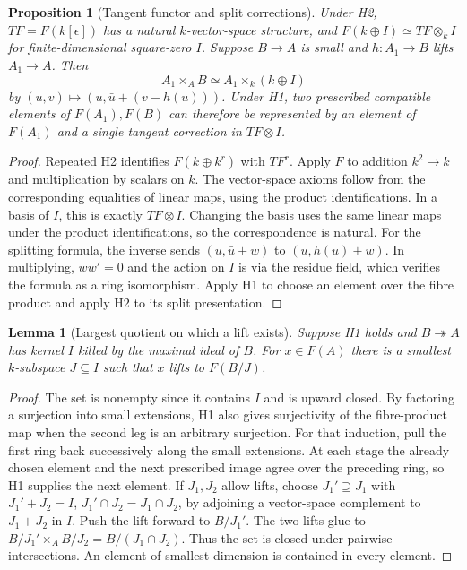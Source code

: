 \documentclass[11pt,oneside,openany]{book}
\newtheorem{lemma}[theorem]{Lemma}
\newtheorem{proposition}[theorem]{Proposition}
\theoremstyle{definition}
\theoremstyle{remark}
\begin{document}
\begin{proposition}[Tangent functor and split corrections]\label{res:T07}
Under H2, \(TF=F(k[\epsilon])\) has a natural \(k\)-vector-space structure,
and \(F(k\oplus I)\simeq TF\otimes_k I\) for finite-dimensional
square-zero \(I\). Suppose \(B\to A\) is small and
\(h:A_1\to B\) lifts \(A_1\to A\). Then
\[
 A_1\times_A B \simeq A_1\times_k (k\oplus I)
\]
by \((u,v)\mapsto (u,\bar u+(v-h(u)))\).
Under H1, two prescribed compatible elements of \(F(A_1),F(B)\)
can therefore be represented by an element of \(F(A_1)\) and a
single tangent correction in \(TF\otimes I\).
\end{proposition}
\begin{proof}
Repeated H2 identifies \(F(k\oplus k^r)\) with \(TF^r\).
Apply \(F\) to addition \(k^2\to k\) and multiplication by scalars
on \(k\). The vector-space axioms follow from the corresponding
equalities of linear maps, using the product identifications.
In a basis of \(I\), this is exactly \(TF\otimes I\).
Changing the basis uses the same linear maps under the product
identifications, so the correspondence is natural.
For the splitting formula, the inverse sends
\((u,\bar u+w)\) to \((u,h(u)+w)\). In multiplying, \(w w'=0\)
and the action on \(I\) is via the residue field, which verifies
the formula as a ring isomorphism. Apply H1 to choose an element
over the fibre product and apply H2 to its split presentation.
\end{proof}

\begin{lemma}[Largest quotient on which a lift exists]\label{res:T08}
Suppose H1 holds and \(B\twoheadrightarrow A\) has kernel \(I\)
killed by the maximal ideal of \(B\). For \(x\in F(A)\) there
is a smallest \(k\)-subspace \(J\subseteq I\) such that \(x\)
lifts to \(F(B/J)\).
\end{lemma}
\begin{proof}
The set is nonempty since it contains \(I\) and is upward closed.
By factoring a surjection into small extensions, H1 also gives
surjectivity of the fibre-product map when the second leg is an
arbitrary surjection. For that induction, pull the first ring
back successively along the small extensions. At each stage the
already chosen element and the next prescribed image agree over
the preceding ring, so H1 supplies the next element.
If \(J_1,J_2\) allow lifts, choose \(J_1'\supseteq J_1\) with
\(J_1'+J_2=I\), \(J_1'\cap J_2=J_1\cap J_2\), by adjoining a
vector-space complement to \(J_1+J_2\) in \(I\).
Push the lift forward to \(B/J_1'\).
The two lifts glue to \(B/J_1'\times_A B/J_2=B/(J_1\cap J_2)\).
Thus the set is closed under pairwise intersections.
An element of smallest dimension is contained in every element.
\end{proof}
\end{document}
